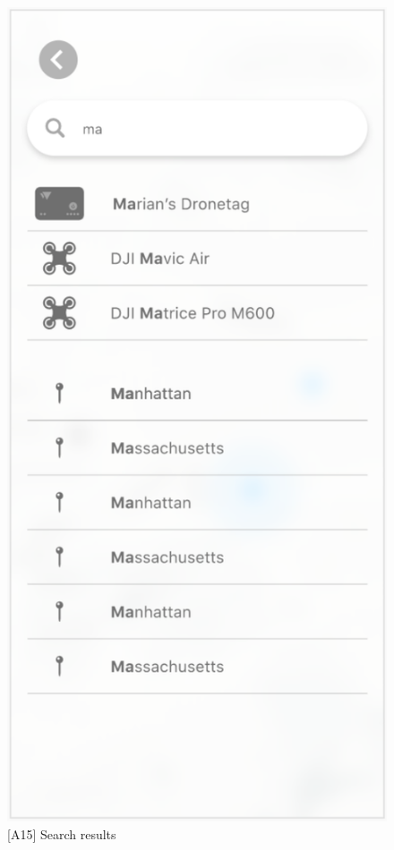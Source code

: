 \begin{figure}
\begin{minipage}{.45\textwidth}
        \includegraphics[width=.7\linewidth]{assets/user_interface_design/search/search_results.png}
        \caption{[A15] Search results}
        \label{fig:search_results}
    \end{minipage}
    \label{fig:search_all}
\end{figure}
